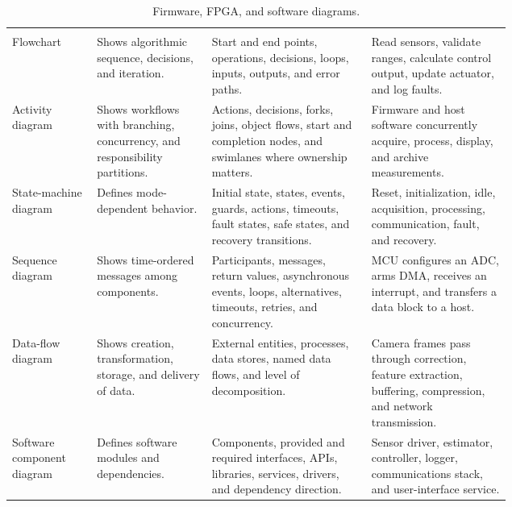 \begin{singlespace}
\setlength{\LTcapwidth}{\linewidth}
\begin{longtable}{@{}L{0.17\linewidth} L{0.23\linewidth} L{0.32\linewidth} L{\tabcolsep\relax}@{}}
\caption{Firmware, FPGA, and software diagrams.}\label{tab:computing-diagrams}\\
 &  &  &  \\
\midrule
\endfirsthead
{}
 &  &  &  \\
\midrule
\endhead
\bottomrule
\endfoot
Flowchart & Shows algorithmic sequence, decisions, and iteration. & Start and end points, operations, decisions, loops, inputs, outputs, and error paths. & Read sensors, validate ranges, calculate control output, update actuator, and log faults. \\
\addlinespace[3pt]
Activity diagram & Shows workflows with branching, concurrency, and responsibility partitions. & Actions, decisions, forks, joins, object flows, start and completion nodes, and swimlanes where ownership matters. & Firmware and host software concurrently acquire, process, display, and archive measurements. \\
\addlinespace[3pt]
State-machine diagram & Defines mode-dependent behavior. & Initial state, states, events, guards, actions, timeouts, fault states, safe states, and recovery transitions. & Reset, initialization, idle, acquisition, processing, communication, fault, and recovery. \\
\addlinespace[3pt]
Sequence diagram & Shows time-ordered messages among components. & Participants, messages, return values, asynchronous events, loops, alternatives, timeouts, retries, and concurrency. & MCU configures an ADC, arms DMA, receives an interrupt, and transfers a data block to a host. \\
\addlinespace[3pt]
Data-flow diagram & Shows creation, transformation, storage, and delivery of data. & External entities, processes, data stores, named data flows, and level of decomposition. & Camera frames pass through correction, feature extraction, buffering, compression, and network transmission. \\
\addlinespace[3pt]
Software component diagram & Defines software modules and dependencies. & Components, provided and required interfaces, APIs, libraries, services, drivers, and dependency direction. & Sensor driver, estimator, controller, logger, communications stack, and user-interface service. \\

\end{longtable}
\end{singlespace}
